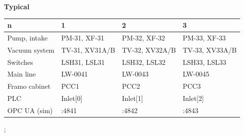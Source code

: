 {{    \textbf{Typical}\\[0.5mm]
    \begin{tabular}{@{}llll@{}}
      \toprule
      n & 1 & 2 & 3 \\
      \midrule
      Pump, intake & PM-31, XF-31 & PM-32, XF-32 & PM-33, XF-33 \\
      Vacuum system & TV-31, XV31A/B & TV-32, XV32A/B & TV-33, XV33A/B \\
      Switches & LSH31, LSL31 & LSH32, LSL32 & LSH33, LSL33 \\
      Main line & LW-0041 & LW-0043 & LW-0045 \\
      Framo cabinet & PCC1 & PCC2 & PCC3 \\
      PLC & Inlet[0] & Inlet[1] & Inlet[2] \\
      OPC UA (sim) & :4841 & :4842 & :4843 \\
      \bottomrule
    \end{tabular}
  };
}
